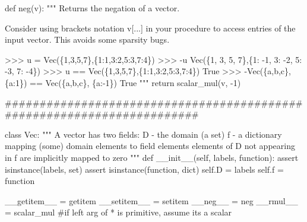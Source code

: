 \documentclass[
  letterpaper,
  DIV=11,
  numbers=noendperiod]{scrartcl}
\newenvironment{Shaded}{\begin{snugshade}}{\end{snugshade}}
\newcommand{\BuiltInTok}[1]{\textcolor[rgb]{0.00,0.23,0.31}{#1}}
\newcommand{\CommentTok}[1]{\textcolor[rgb]{0.37,0.37,0.37}{#1}}
\newcommand{\ControlFlowTok}[1]{\textcolor[rgb]{0.00,0.23,0.31}{#1}}
\newcommand{\DecValTok}[1]{\textcolor[rgb]{0.68,0.00,0.00}{#1}}
\newcommand{\FunctionTok}[1]{\textcolor[rgb]{0.28,0.35,0.67}{#1}}
\newcommand{\KeywordTok}[1]{\textcolor[rgb]{0.00,0.23,0.31}{#1}}
\newcommand{\NormalTok}[1]{\textcolor[rgb]{0.00,0.23,0.31}{#1}}
\newcommand{\OperatorTok}[1]{\textcolor[rgb]{0.37,0.37,0.37}{#1}}
\newcommand{\VariableTok}[1]{\textcolor[rgb]{0.07,0.07,0.07}{#1}}
\begin{document}
\begin{Shaded}
\begin{Highlighting}[numbers=left,,]
\KeywordTok{def}\NormalTok{ neg(v):}
    \CommentTok{"""}
\CommentTok{    Returns the negation of a vector.}

\CommentTok{    Consider using brackets notation v[...] in your procedure}
\CommentTok{    to access entries of the input vector.  This avoids some sparsity bugs.}

\CommentTok{    \textgreater{}\textgreater{}\textgreater{} u = Vec(\{1,3,5,7\},\{1:1,3:2,5:3,7:4\})}
\CommentTok{    \textgreater{}\textgreater{}\textgreater{} {-}u}
\CommentTok{    Vec(\{1, 3, 5, 7\},\{1: {-}1, 3: {-}2, 5: {-}3, 7: {-}4\})}
\CommentTok{    \textgreater{}\textgreater{}\textgreater{} u == Vec(\{1,3,5,7\},\{1:1,3:2,5:3,7:4\})}
\CommentTok{    True}
\CommentTok{    \textgreater{}\textgreater{}\textgreater{} {-}Vec(\{\textquotesingle{}a\textquotesingle{},\textquotesingle{}b\textquotesingle{},\textquotesingle{}c\textquotesingle{}\}, \{\textquotesingle{}a\textquotesingle{}:1\}) == Vec(\{\textquotesingle{}a\textquotesingle{},\textquotesingle{}b\textquotesingle{},\textquotesingle{}c\textquotesingle{}\}, \{\textquotesingle{}a\textquotesingle{}:{-}1\})}
\CommentTok{    True}
\CommentTok{    """}
    \ControlFlowTok{return}\NormalTok{ scalar\_mul(v, }\OperatorTok{{-}}\DecValTok{1}\NormalTok{)}

\CommentTok{\#\#\#\#\#\#\#\#\#\#\#\#\#\#\#\#\#\#\#\#\#\#\#\#\#\#\#\#\#\#\#\#\#\#\#\#\#\#\#\#\#\#\#\#\#\#\#\#\#\#\#\#\#\#\#\#\#\#\#\#\#\#\#\#\#\#\#\#\#\#\#}

\KeywordTok{class}\NormalTok{ Vec:}
    \CommentTok{"""}
\CommentTok{    A vector has two fields:}
\CommentTok{    D {-} the domain (a set)}
\CommentTok{    f {-} a dictionary mapping (some) domain elements to field elements}
\CommentTok{        elements of D not appearing in f are implicitly mapped to zero}
\CommentTok{    """}
    \KeywordTok{def} \FunctionTok{\_\_init\_\_}\NormalTok{(}\VariableTok{self}\NormalTok{, labels, function):}
        \ControlFlowTok{assert} \BuiltInTok{isinstance}\NormalTok{(labels, }\BuiltInTok{set}\NormalTok{)}
        \ControlFlowTok{assert} \BuiltInTok{isinstance}\NormalTok{(function, }\BuiltInTok{dict}\NormalTok{)}
        \VariableTok{self}\NormalTok{.D }\OperatorTok{=}\NormalTok{ labels}
        \VariableTok{self}\NormalTok{.f }\OperatorTok{=}\NormalTok{ function}

    \FunctionTok{\_\_getitem\_\_} \OperatorTok{=}\NormalTok{ getitem}
    \FunctionTok{\_\_setitem\_\_} \OperatorTok{=}\NormalTok{ setitem}
    \FunctionTok{\_\_neg\_\_} \OperatorTok{=}\NormalTok{ neg}
    \FunctionTok{\_\_rmul\_\_} \OperatorTok{=}\NormalTok{ scalar\_mul }\CommentTok{\#if left arg of * is primitive, assume it\textquotesingle{}s a scalar}


\end{Highlighting}
\end{Shaded}
\end{document}
